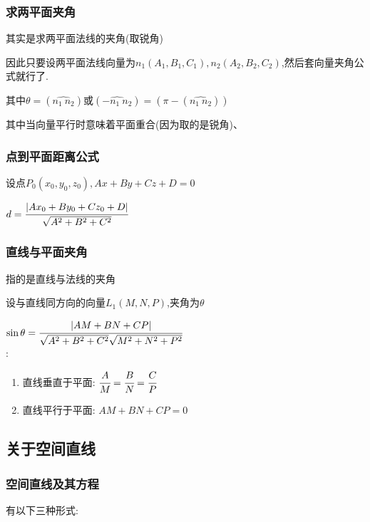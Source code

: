 {{    \subsubsection{求两平面夹角}{
      其实是求两平面法线的夹角(取锐角)

      因此只要设两平面法线向量为$n_1(A_1,B_1,C_1),n_2(A_2,B_2,C_2)$,然后套向量夹角公式就行了.

      其中$\theta = (\widehat{n_1\ n_2})$或$(\widehat{-n_1\ n_2}) = (\pi - (\widehat{n_1\ n_2}))$

      其中当向量平行时意味着平面重合(因为取的是锐角)、
    }%

    \subsubsection{点到平面距离公式}{
      设点$P_0(x_0,y_0,z_0),Ax + By + Cz + D = 0$

      $d = \cfrac{|Ax_0 + By_0 + Cz_0 + D|}{\sqrt{A^2 + B^2 + C^2}}$
    }%

    \subsubsection{直线与平面夹角}{
      指的是直线与法线的夹角

      设与直线同方向的向量$L_1(M,N,P)$,夹角为$\theta$

      $\sin\theta = \cfrac{|AM + BN + CP|}{\sqrt{A^2 + B^2 + C^2}\sqrt{M^2 + N^2 + P^2}}$\\

      :
      \begin{enumerate}
        \item 直线垂直于平面: $\cfrac{A}{M} = \cfrac{B}{N} = \cfrac{C}{P}$
        \item 直线平行于平面: $AM + BN + CP = 0$
      \end{enumerate}
    }%

  }%

  \subsection{关于空间直线}{

    \subsubsection{空间直线及其方程}{
      有以下三种形式:

}}}
